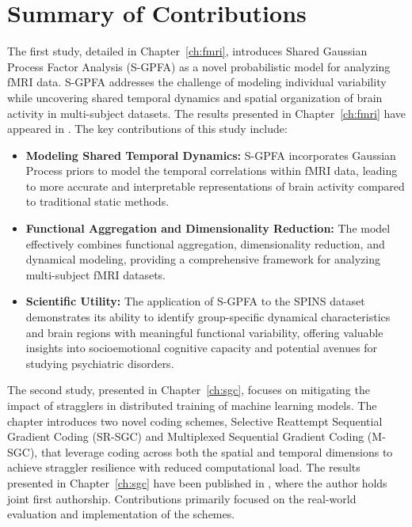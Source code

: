 \section{Summary of Contributions}

The first study, detailed in Chapter~\ref{ch:fmri}, introduces Shared Gaussian Process Factor Analysis (S-GPFA) as a novel probabilistic model for analyzing fMRI data. S-GPFA addresses the challenge of modeling individual variability while uncovering shared temporal dynamics and spatial organization of brain activity in multi-subject datasets. The results presented in Chapter~\ref{ch:fmri} have appeared in \cite{ebrahimi2023time}. The key contributions of this study include:

\begin{itemize}
    \item \textbf{Modeling Shared Temporal Dynamics:} S-GPFA incorporates Gaussian Process priors to model the temporal correlations within fMRI data, leading to more accurate and interpretable representations of brain activity compared to traditional static methods.
    \item \textbf{Functional Aggregation and Dimensionality Reduction:} The model effectively combines functional aggregation, dimensionality reduction, and dynamical modeling, providing a comprehensive framework for analyzing multi-subject fMRI datasets. 
    \item \textbf{Scientific Utility:}  The application of S-GPFA to the SPINS dataset demonstrates its ability to identify group-specific dynamical characteristics and brain regions with meaningful functional variability, offering valuable insights into socioemotional cognitive capacity and potential avenues for studying psychiatric disorders. 
\end{itemize}

The second study, presented in Chapter~\ref{ch:sgc}, focuses on mitigating the impact of stragglers in distributed training of machine learning models. The chapter introduces two novel coding schemes, Selective Reattempt Sequential Gradient Coding (SR-SGC) and Multiplexed Sequential Gradient Coding (M-SGC), that leverage coding across both the spatial and temporal dimensions to achieve straggler resilience with reduced computational load. The results presented in Chapter~\ref{ch:sgc} have been published in \cite{krishnan2023sequential}, where the author holds joint first authorship. Contributions primarily focused on the real-world evaluation and implementation of the schemes.

